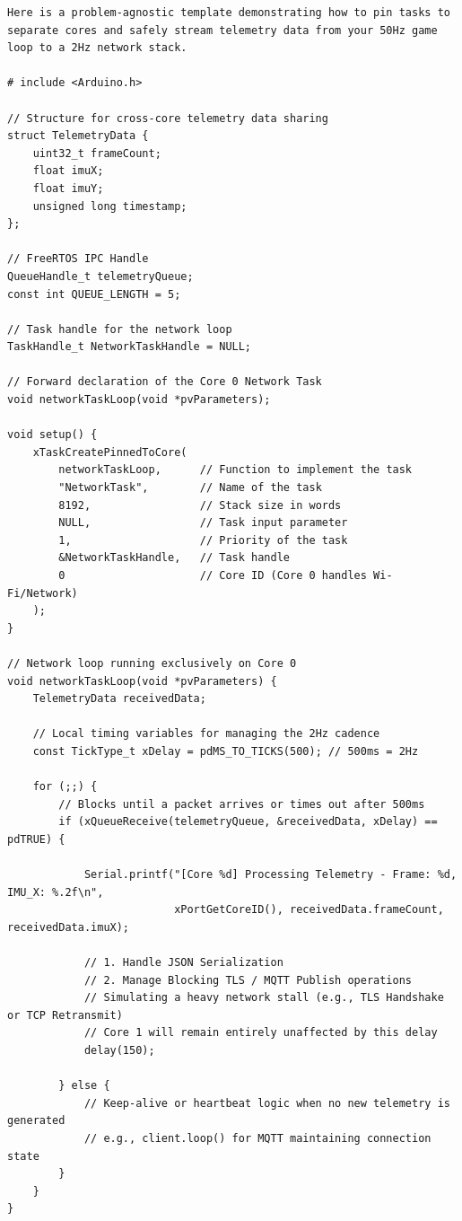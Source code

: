\begin{lstlisting}[language={}, breaklines=true]
Here is a problem-agnostic template demonstrating how to pin tasks to separate cores and safely stream telemetry data from your 50Hz game loop to a 2Hz network stack.

# include <Arduino.h>

// Structure for cross-core telemetry data sharing
struct TelemetryData {
    uint32_t frameCount;
    float imuX;
    float imuY;
    unsigned long timestamp;
};

// FreeRTOS IPC Handle
QueueHandle_t telemetryQueue;
const int QUEUE_LENGTH = 5;

// Task handle for the network loop
TaskHandle_t NetworkTaskHandle = NULL;

// Forward declaration of the Core 0 Network Task
void networkTaskLoop(void *pvParameters);

void setup() {
    xTaskCreatePinnedToCore(
        networkTaskLoop,      // Function to implement the task
        "NetworkTask",        // Name of the task
        8192,                 // Stack size in words
        NULL,                 // Task input parameter
        1,                    // Priority of the task
        &NetworkTaskHandle,   // Task handle
        0                     // Core ID (Core 0 handles Wi-Fi/Network)
    );
}

// Network loop running exclusively on Core 0
void networkTaskLoop(void *pvParameters) {
    TelemetryData receivedData;

    // Local timing variables for managing the 2Hz cadence
    const TickType_t xDelay = pdMS_TO_TICKS(500); // 500ms = 2Hz

    for (;;) {
        // Blocks until a packet arrives or times out after 500ms
        if (xQueueReceive(telemetryQueue, &receivedData, xDelay) == pdTRUE) {
            
            Serial.printf("[Core %d] Processing Telemetry - Frame: %d, IMU_X: %.2f\n", 
                          xPortGetCoreID(), receivedData.frameCount, receivedData.imuX);

            // 1. Handle JSON Serialization
            // 2. Manage Blocking TLS / MQTT Publish operations
            // Simulating a heavy network stall (e.g., TLS Handshake or TCP Retransmit)
            // Core 1 will remain entirely unaffected by this delay
            delay(150); 
            
        } else {
            // Keep-alive or heartbeat logic when no new telemetry is generated
            // e.g., client.loop() for MQTT maintaining connection state
        }
    }
}
\end{lstlisting}
